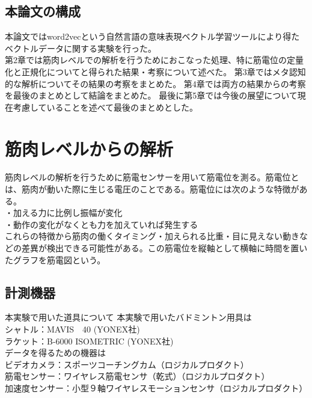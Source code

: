 \documentclass[11pt,a4j,notitlepage]{jreport}
\begin{document}
\section{本論文の構成}
 本論文ではword2vecという自然言語の意味表現ベクトル学習ツールにより得たベクトルデータに関する実験を行った。\\
第2章では筋肉レベルでの解析を行うためにおこなった処理、特に筋電位の定量化と正規化についてと得られた結果・考察について述べた。
第3章ではメタ認知的な解析についてその結果の考察をまとめた。
第4章では両方の結果からの考察を最後のまとめとして結論をまとめた。
最後に第5章では今後の展望について現在考慮していることを述べて最後のまとめとした。

\chapter{筋肉レベルからの解析}
筋肉レベルの解析を行うために筋電センサーを用いて筋電位を測る。筋電位とは、筋肉が動いた際に生じる電圧のことである。筋電位には次のような特徴がある。\\
・加える力に比例し振幅が変化\\
・動作の変化がなくとも力を加えていれば発生する\\
   これらの特徴から筋肉の働くタイミング・加えられる比重・目に見えない動きなどの差異が検出できる可能性がある。この筋電位を縦軸として横軸に時間を置いたグラフを筋電図という。

\section{計測機器}
本実験で用いた道具について
本実験で用いたバドミントン用具は\\
シャトル：MAVIS　40 (YONEX社)\\
ラケット：B-6000 ISOMETRIC (YONEX社)\\
データを得るための機器は\\
ビデオカメラ：スポーツコーチングカム（ロジカルプロダクト）\\
筋電センサー：ワイヤレス筋電センサ（乾式）（ロジカルプロダクト）\\
加速度センサー：小型９軸ワイヤレスモーションセンサ（ロジカルプロダクト）\\
\\
\end{document}
